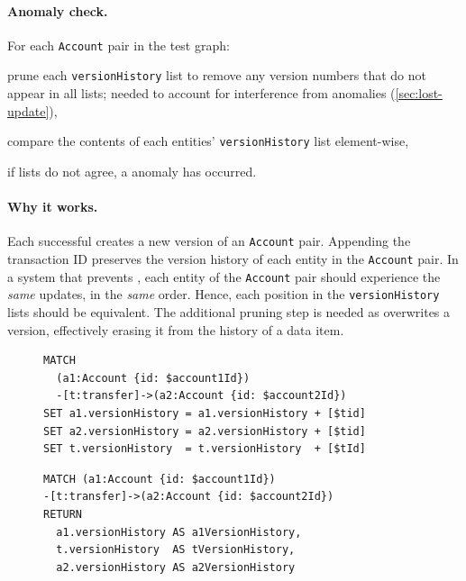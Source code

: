 \paragraph{Anomaly check.}
For each \texttt{Account} pair in the test graph:
\begin{enumerate*}[label={(\roman*)}]
  \item prune each \texttt{versionHistory} list to remove any version numbers
  that do not appear in all lists; needed to account for interference from
   anomalies (\autoref{sec:lost-update}),
  \item compare the contents of each entities' \texttt{versionHistory} list
  element-wise,
  \item if lists do not agree, a  anomaly has occurred.

\end{enumerate*}

\paragraph{Why it works.}
Each successful  creates a new version of an
\texttt{Account} pair. Appending the transaction ID preserves the version
history of each entity in the \texttt{Account} pair. In a system that prevents
, each entity of the \texttt{Account} pair should experience the
\emph{same} updates, in the \emph{same} order. Hence, each position in the
\texttt{versionHistory} lists should be equivalent. The additional pruning step
is needed as  overwrites a version, effectively erasing it
from the history of a data item.

\begin{figure}[htb]
  \centering
  \begin{minipage}{0.53\linewidth}
    \begin{lstlisting}[language=cypher,label=fig:dw1,caption=\tx{Dirty Write (G0) $T_\mathrm{W}$}.]
MATCH
  (a1:Account {id: $account1Id})
  -[t:transfer]->(a2:Account {id: $account2Id})
SET a1.versionHistory = a1.versionHistory + [$tid]
SET a2.versionHistory = a2.versionHistory + [$tid]
SET t.versionHistory  = t.versionHistory  + [$tId]
\end{lstlisting}
  \end{minipage}
  \quad
  \begin{minipage}{0.431\linewidth}
    \begin{lstlisting}[language=cypher,label=fig:dw2,caption=\tx{Dirty Write (G0) $T_\mathrm{R}$}.]
MATCH (a1:Account {id: $account1Id})
-[t:transfer]->(a2:Account {id: $account2Id})
RETURN
  a1.versionHistory AS a1VersionHistory,
  t.versionHistory  AS tVersionHistory,
  a2.versionHistory AS a2VersionHistory
\end{lstlisting}
  \end{minipage}
\end{figure}

